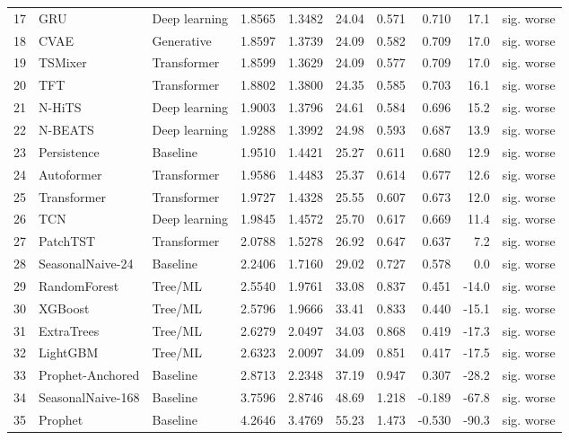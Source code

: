 \begin{table}[ht]
\begin{tabular}{lllrrrrrrr}
17 & GRU & Deep learning & 1.8565 & 1.3482 & 24.04 & 0.571 & 0.710 & 17.1 & sig. worse \\
18 & CVAE & Generative & 1.8597 & 1.3739 & 24.09 & 0.582 & 0.709 & 17.0 & sig. worse \\
19 & TSMixer & Transformer & 1.8599 & 1.3629 & 24.09 & 0.577 & 0.709 & 17.0 & sig. worse \\
20 & TFT & Transformer & 1.8802 & 1.3800 & 24.35 & 0.585 & 0.703 & 16.1 & sig. worse \\
21 & N-HiTS & Deep learning & 1.9003 & 1.3796 & 24.61 & 0.584 & 0.696 & 15.2 & sig. worse \\
22 & N-BEATS & Deep learning & 1.9288 & 1.3992 & 24.98 & 0.593 & 0.687 & 13.9 & sig. worse \\
23 & Persistence & Baseline & 1.9510 & 1.4421 & 25.27 & 0.611 & 0.680 & 12.9 & sig. worse \\
24 & Autoformer & Transformer & 1.9586 & 1.4483 & 25.37 & 0.614 & 0.677 & 12.6 & sig. worse \\
25 & Transformer & Transformer & 1.9727 & 1.4328 & 25.55 & 0.607 & 0.673 & 12.0 & sig. worse \\
26 & TCN & Deep learning & 1.9845 & 1.4572 & 25.70 & 0.617 & 0.669 & 11.4 & sig. worse \\
27 & PatchTST & Transformer & 2.0788 & 1.5278 & 26.92 & 0.647 & 0.637 & 7.2 & sig. worse \\
28 & SeasonalNaive-24 & Baseline & 2.2406 & 1.7160 & 29.02 & 0.727 & 0.578 & 0.0 & sig. worse \\
29 & RandomForest & Tree/ML & 2.5540 & 1.9761 & 33.08 & 0.837 & 0.451 & -14.0 & sig. worse \\
30 & XGBoost & Tree/ML & 2.5796 & 1.9666 & 33.41 & 0.833 & 0.440 & -15.1 & sig. worse \\
31 & ExtraTrees & Tree/ML & 2.6279 & 2.0497 & 34.03 & 0.868 & 0.419 & -17.3 & sig. worse \\
32 & LightGBM & Tree/ML & 2.6323 & 2.0097 & 34.09 & 0.851 & 0.417 & -17.5 & sig. worse \\
33 & Prophet-Anchored & Baseline & 2.8713 & 2.2348 & 37.19 & 0.947 & 0.307 & -28.2 & sig. worse \\
34 & SeasonalNaive-168 & Baseline & 3.7596 & 2.8746 & 48.69 & 1.218 & -0.189 & -67.8 & sig. worse \\
35 & Prophet & Baseline & 4.2646 & 3.4769 & 55.23 & 1.473 & -0.530 & -90.3 & sig. worse \\
\bottomrule
\end{tabular}
\end{table}